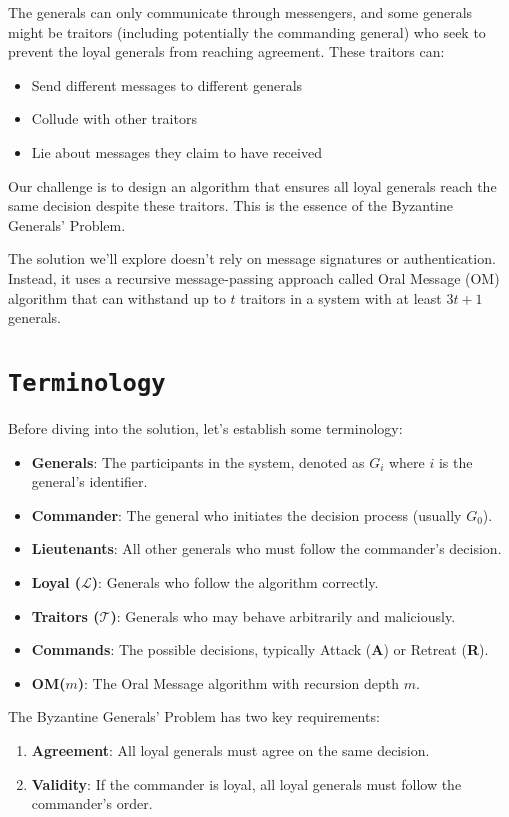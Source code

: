 \documentclass[11pt]{article}
\begin{document}
The generals can only communicate through messengers, and some generals might be traitors (including potentially the commanding general) who seek to prevent the loyal generals from reaching agreement. These traitors can:
\begin{itemize}
    \item Send different messages to different generals
    \item Collude with other traitors
    \item Lie about messages they claim to have received
\end{itemize}

Our challenge is to design an algorithm that ensures all loyal generals reach the same decision despite these traitors. This is the essence of the Byzantine Generals' Problem.

The solution we'll explore doesn't rely on message signatures or authentication. Instead, it uses a recursive message-passing approach called Oral Message (OM) algorithm that can withstand up to $t$ traitors in a system with at least $3t+1$ generals.

\section*{\texttt{\Large Terminology}}
Before diving into the solution, let's establish some terminology:

\begin{itemize}
    \item \textbf{Generals}: The participants in the system, denoted as $G_i$ where $i$ is the general's identifier.
    \item \textbf{Commander}: The general who initiates the decision process (usually $G_0$).
    \item \textbf{Lieutenants}: All other generals who must follow the commander's decision.
    \item \textbf{Loyal ($\mathcal{L}$)}: Generals who follow the algorithm correctly.
    \item \textbf{Traitors ($\mathcal{T}$)}: Generals who may behave arbitrarily and maliciously.
    \item \textbf{Commands}: The possible decisions, typically Attack (\textbf{A}) or Retreat (\textbf{R}).
    \item \textbf{OM($m$)}: The Oral Message algorithm with recursion depth $m$.
\end{itemize}

The Byzantine Generals' Problem has two key requirements:
\begin{enumerate}
    \item \textbf{Agreement}: All loyal generals must agree on the same decision.
    \item \textbf{Validity}: If the commander is loyal, all loyal generals must follow the commander's order.
\end{enumerate}
\end{document}

